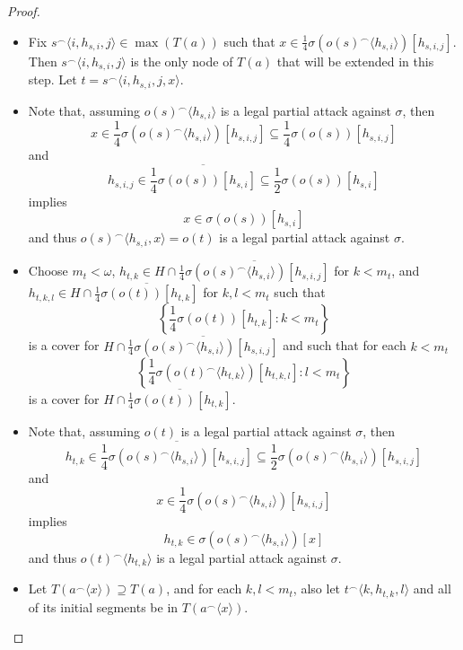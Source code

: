 \documentclass{amsart}
\theoremstyle{definition}
\theoremstyle{remark}
\newcommand{\<}{\langle}
\renewcommand{\>}{\rangle}
\newcommand{\cl}[1]{\overline{#1}}
\newcommand{\concat}{^\frown}
\begin{document}
\begin{proof}
  \begin{itemize}
    \item Fix $s\concat\<i,h_{s,i},j\>\in\max(T(a))$ such that 
      $x\in \frac{1}{4}\sigma(o(s)\concat\<h_{s,i}\>)[h_{s,i,j}]$.  
      Then $s\concat\<i,h_{s,i},j\>$ is the only node of $T(a)$ that will be 
      extended in this step. Let $t=s\concat\<i,h_{s,i},j,x\>$.
    \item Note that, assuming $o(s)\concat\<h_{s,i}\>$ is a legal partial attack against $\sigma$, then
      \[
        x
          \in
        \frac{1}{4}\sigma(o(s)\concat\<h_{s,i}\>)[h_{s,i,j}]
          \subseteq
        \frac{1}{4}\sigma(o(s))[h_{s,i,j}]
      \]
    and
      \[
        h_{s,i,j}
          \in
        \cl{\frac{1}{4}\sigma(o(s))[h_{s,i}]}
          \subseteq
        \frac{1}{2}\sigma(o(s))[h_{s,i}]
      \]
    implies
      \[
        x
          \in
        \sigma(o(s))[h_{s,i}]
      \]
    and thus $o(s)\concat\<h_{s,i},x\>=o(t)$ is a legal partial attack against $\sigma$.
    \item Choose $m_t<\omega$, $h_{t,k}\in H\cap \cl{\frac{1}{4}\sigma(o(s)\concat\<h_{s,i}\>)[h_{s,i,j}]}$ for $k<m_t$, and $h_{t,k,l}\in H\cap\cl{\frac{1}{4}\sigma(o(t))[h_{t,k}]}$ for $k,l<m_t$ such that
      \[
        \left\{\frac{1}{4}\sigma(o(t))[h_{t,k}]:k<m_t\right\}
      \]
    is a cover for $H\cap \cl{\frac{1}{4}\sigma(o(s)\concat\<h_{s,i}\>)[h_{s,i,j}]}$ and such that for each $k<m_t$
      \[
        \left\{\frac{1}{4}\sigma(o(t)\concat\<h_{t,k}\>)[h_{t,k,l}]:l<m_t\right\}
      \]
    is a cover for $H\cap\cl{\frac{1}{4}\sigma(o(t))[h_{t,k}]}$.
    \item Note that, assuming $o(t)$ is a legal partial attack against $\sigma$, then
      \[
        h_{t,k}
          \in
        \cl{\frac{1}{4}\sigma(o(s)\concat\<h_{s,i}\>)[h_{s,i,j}]}
          \subseteq
        \frac{1}{2}\sigma(o(s)\concat\<h_{s,i}\>)[h_{s,i,j}]
      \]
    and
      \[
        x
          \in
        \frac{1}{4}\sigma(o(s)\concat\<h_{s,i}\>)[h_{s,i,j}]
      \]
    implies
      \[
        h_{t,k}
          \in
        \sigma(o(s)\concat\<h_{s,i}\>)[x]
      \]
    and thus $o(t)\concat\<h_{t,k}\>$ is a legal partial attack against $\sigma$.

    \item Let $T(a\concat\<x\>)\supseteq T(a)$, and for each $k,l<m_t$, 
    also let $t\concat\<k,h_{t,k},l\>$ and all of its initial segments be in 
    $T(a\concat\<x\>)$.
  \end{itemize}

    \bigskip


\end{proof}
\end{document}
